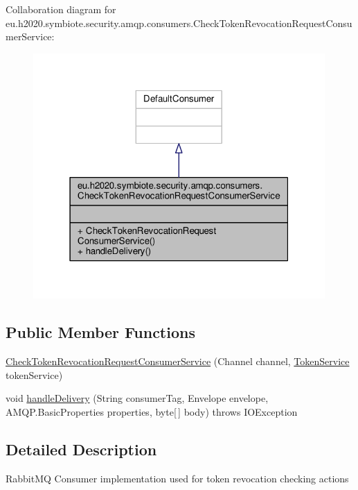 Collaboration diagram for eu.\+h2020.\+symbiote.\+security.\+amqp.\+consumers.\+Check\+Token\+Revocation\+Request\+Consumer\+Service\+:
\nopagebreak
\begin{figure}[H]
\begin{center}
\leavevmode
\includegraphics[width=316pt]{classeu_1_1h2020_1_1symbiote_1_1security_1_1amqp_1_1consumers_1_1CheckTokenRevocationRequestConsumerService__coll__graph}
\end{center}
\end{figure}
\subsection*{Public Member Functions}
\begin{DoxyCompactItemize}
\item 
\hyperlink{classeu_1_1h2020_1_1symbiote_1_1security_1_1amqp_1_1consumers_1_1CheckTokenRevocationRequestConsumerService_af94d46927f2be0bb40d3c514ea75ede1}{Check\+Token\+Revocation\+Request\+Consumer\+Service} (Channel channel, \hyperlink{classeu_1_1h2020_1_1symbiote_1_1security_1_1services_1_1TokenService}{Token\+Service} token\+Service)
\item 
void \hyperlink{classeu_1_1h2020_1_1symbiote_1_1security_1_1amqp_1_1consumers_1_1CheckTokenRevocationRequestConsumerService_a99b366f93335c08c6de1aa2a77d967e0}{handle\+Delivery} (String consumer\+Tag, Envelope envelope, A\+M\+Q\+P.\+Basic\+Properties properties, byte\mbox{[}$\,$\mbox{]} body)  throws I\+O\+Exception 
\end{DoxyCompactItemize}


\subsection{Detailed Description}
Rabbit\+MQ Consumer implementation used for token revocation checking actions 


